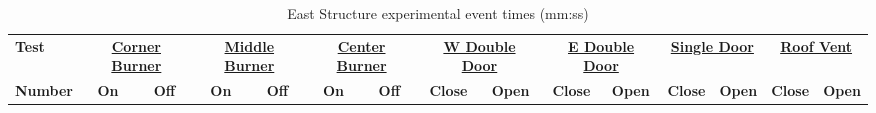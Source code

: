\documentclass[12pt,oneside]{book}
\begin{document}
\begin{landscape}
\begin{table}[!ht]
\caption{East Structure experimental event times (mm:ss)}
\begin{tabular}{lcccccccccccccc}
 \toprule
\textbf{Test} & 
\multicolumn{2}{c}{\textbf{\underline{Corner Burner}}} & 
\multicolumn{2}{c}{\textbf{\underline{Middle Burner}}} & 
\multicolumn{2}{c}{\textbf{\underline{Center Burner}}} & 
\multicolumn{2}{c}{\textbf{\underline{W Double Door}}} & 
\multicolumn{2}{c}{\textbf{\underline{E Double Door}}} & 
\multicolumn{2}{c}{\textbf{\underline{Single Door}}} & 
\multicolumn{2}{c}{\textbf{\underline{Roof Vent}}}
\\
\textbf{Number} & 
\textbf{On} & \textbf{Off} & \textbf{On} & \textbf{Off} & \textbf{On} & \textbf{Off} & 
\textbf{Close} & \textbf{Open} & \textbf{Close} & \textbf{Open} &
\textbf{Close} & \textbf{Open} & \textbf{Close} & \textbf{Open}

\end{tabular}
\end{table}
\end{landscape}
\end{document}
